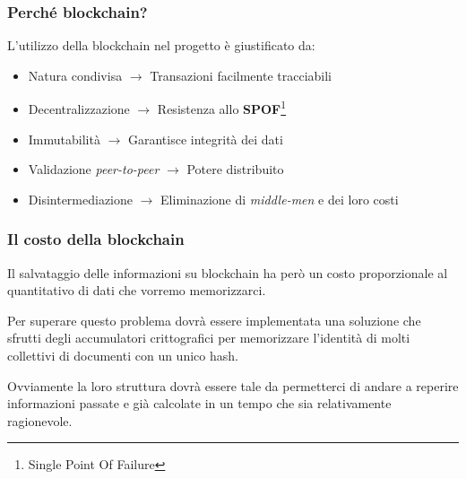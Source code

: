 \documentclass{beamer}
\begin{document}
\begin{frame}
	\frametitle{Perché blockchain?}
	L'utilizzo della blockchain nel progetto è giustificato da:
	\begin{itemize}
		\item Natura condivisa \(\rightarrow\) Transazioni facilmente tracciabili
		\item Decentralizzazione \(\rightarrow\) Resistenza allo \textbf{SPOF}\footnote{Single Point Of Failure}
		\item Immutabilità \(\rightarrow\) Garantisce integrità dei dati
		\item Validazione \emph{peer-to-peer} \(\rightarrow\) Potere distribuito
		\item Disintermediazione \(\rightarrow\) Eliminazione di \emph{middle-men} e dei loro costi
	\end{itemize}
\end{frame}

\begin{frame}
	\frametitle{Il costo della blockchain}
	Il salvataggio delle informazioni su blockchain ha però un costo proporzionale al quantitativo
	di dati che vorremo memorizzarci.
	
	Per superare questo problema dovrà essere implementata una soluzione che sfrutti
	degli accumulatori crittografici per memorizzare l'identità di molti collettivi di documenti
	con un unico hash.

	Ovviamente la loro struttura dovrà essere tale da permetterci di andare a reperire
	informazioni passate e già calcolate in un tempo che sia relativamente ragionevole.
\end{frame}
\end{document}
